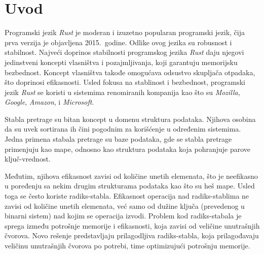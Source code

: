 \documentclass[12pt,oneside]{memoir}
\begin{document}
\frontmatter
\naslovna
\komisija
\apstrakt
\tableofcontents*

\mainmatter

\chapter{Uvod}
Programski jezik \textit{Rust} je moderan i izuzetno popularan programski jezik,
čija prva verzija je objavljena 2015.\ godine. Odlike ovog jezika su
robusnost i stabilnost. Najveći doprinos stabilnosti
programskog jezika \textit{Rust} daju
njegovi jedinstveni koncepti vlasništva i pozajmljivanja, koji garantuju
memorijsku bezbednost. Koncept vlasništva takođe
omogućava odsustvo skupljača otpadaka, što doprinosi efikasnosti.
Usled fokusa na stablinost i bezbednost, programski jezik \textit{Rust}
se koristi u sistemima renomiranih kompanija kao što su
\textit{Mozilla}, \textit{Google}, \textit{Amazon},
i \textit{Microsoft}.

Stabla pretrage su bitan koncept u domenu struktura podataka.
Njihova osobina da su uvek sortirana ih čini pogodnim za korišćenje
u određenim sistemima.
Jedna primena stabala pretrage su baze podataka, gde se stabla pretrage
primenjuju kao mape, odnosno kao struktura podataka koja pohranjuje
parove ključ-vrednost.

Međutim, njihova efikasnost
zavisi od količine unetih elemenata, što je neefikasno u poređenju sa nekim
drugim strukturama podataka kao što su heš mape.
Usled toga se često koriste
radiks-stabla. Efikasnost operacija
nad radiks-stablima ne zavisi od količine unetih elemenata,
već samo od dužine ključa (prevedenog u binarni sistem) nad kojim se operacija izvodi.
Problem kod radiks-stabala je sprega između potrošnje memorije i efikasnosti,
koja zavisi od veličine unutrašnjih čvorova.
Novo rešenje predstavljaju
prilagodljiva radiks-stabla, koja prilagođavaju veličinu unutrašnjih čvorova
po potrebi, time optimizujući potrošnju memorije.
\end{document}
